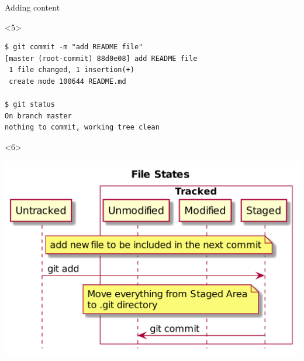\documentclass[presentation,aspectratio=169,smaller]{beamer}
\begin{document}
\begin{frame}[label={sec:org2912395},fragile]{Adding content}
\begin{onlyenv}<5>
\begin{verbatim}
$ git commit -m "add README file"
[master (root-commit) 88d0e08] add README file
 1 file changed, 1 insertion(+)
 create mode 100644 README.md

$ git status
On branch master
nothing to commit, working tree clean
\end{verbatim}
\end{onlyenv}

\begin{onlyenv}<6>
\begin{center}
\includegraphics[width=.9\linewidth]{images/git-add-2.png}
\end{center}
\end{onlyenv}
\end{frame}
\end{document}
